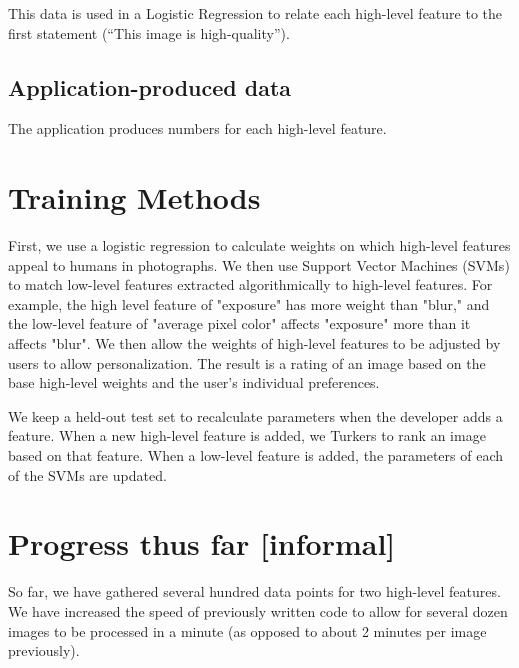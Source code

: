 \documentclass[10pt,twocolumn]{article}
\begin{document}


This data is used in a Logistic Regression to relate each high-level feature to the first statement (``This image is high-quality'').

\subsection{Application-produced data}
The application produces numbers for each high-level feature.

\section{Training Methods}
\label{methods}

First, we use a logistic regression to calculate weights on which high-level features appeal to humans in photographs. We then use Support Vector Machines (SVMs) to match low-level features extracted algorithmically to high-level features. For example, the high level feature of "exposure" has more weight than "blur," and the low-level feature of "average pixel color" affects "exposure" more than it affects "blur". We then allow the weights of high-level features to be adjusted by users to allow personalization. The result is a rating of an image based on the base high-level weights and the user's individual preferences.

We keep a held-out test set to recalculate parameters when the developer adds a feature. When a new high-level feature is added, we Turkers to rank an image based on that feature. When a low-level feature is added, the parameters of each of the SVMs are updated.


\section{Progress thus far [informal]}
So far, we have gathered several hundred data points for two high-level features. We have increased the speed of previously written code to allow for several dozen images to be processed in a minute (as opposed to about 2 minutes per image previously).
\end{document}

